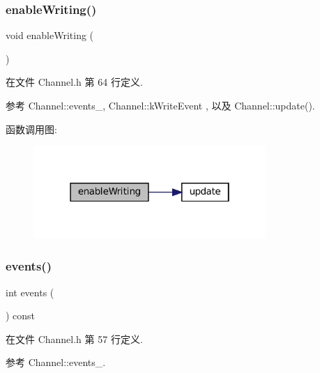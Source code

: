 \subsubsection{\texorpdfstring{enable\+Writing()}{enableWriting()}}
{\footnotesize\ttfamily void enable\+Writing (\begin{DoxyParamCaption}{ }\end{DoxyParamCaption})\hspace{0.3cm}{\ttfamily [inline]}}



在文件 Channel.\+h 第 64 行定义.



参考 Channel\+::events\+\_\+, Channel\+::k\+Write\+Event , 以及 Channel\+::update().

函数调用图\+:
\nopagebreak
\begin{figure}[H]
\begin{center}
\leavevmode
\includegraphics[width=250pt]{classmuduo_1_1net_1_1Channel_af1dff4317f202ed06097a1425a4dca6d_cgraph}
\end{center}
\end{figure}
\mbox{\label{classmuduo_1_1net_1_1Channel_ae4f693c8725a3c04d41dee8bb4266f7e}} 
\subsubsection{\texorpdfstring{events()}{events()}}
{\footnotesize\ttfamily int events (\begin{DoxyParamCaption}{ }\end{DoxyParamCaption}) const\hspace{0.3cm}{\ttfamily [inline]}}



在文件 Channel.\+h 第 57 行定义.



参考 Channel\+::events\+\_\+.

\mbox{\label{classmuduo_1_1net_1_1Channel_aebf2f9df0b2ab24a22a9e50d6f619a89}} 
